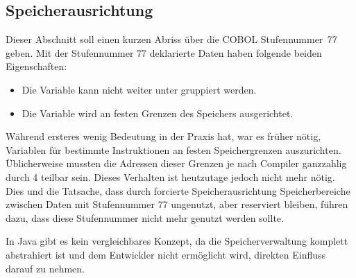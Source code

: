 \subsection{Speicherausrichtung}
Dieser Abschnitt soll einen kurzen Abriss über die COBOL Stufennummer \textit{77} geben. Mit der Stufennummer 77 deklarierte Daten haben folgende beiden Eigenschaften:

\begin{itemize}
    \item Die Variable kann nicht weiter unter gruppiert werden.
    \item Die Variable wird an festen Grenzen des Speichers ausgerichtet.
\end{itemize}

Während ersteres wenig Bedeutung in der Praxis hat, war es früher nötig, Variablen für bestimmte Instruktionen an festen Speichergrenzen auszurichten. Üblicherweise mussten die Adressen dieser Grenzen je nach Compiler ganzzahlig durch 4  teilbar sein. Dieses Verhalten ist heutzutage jedoch nicht mehr nötig. Dies und die Tatsache, dass durch forcierte Speicherausrichtung Speicherbereiche zwischen Daten mit Stufennummer 77 ungenutzt, aber reserviert bleiben, führen dazu, dass diese Stufennummer nicht mehr genutzt werden sollte.

In Java gibt es kein vergleichbares Konzept, da die Speicherverwaltung komplett abstrahiert ist und dem Entwickler nicht ermöglicht wird, direkten Einfluss darauf zu nehmen.